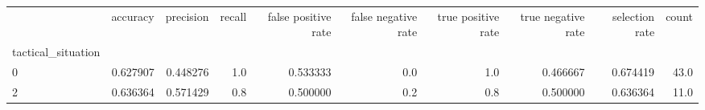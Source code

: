 \begin{tabular}{lrrrrrrrrr}
\toprule
{} &  accuracy &  precision &  recall &  false positive rate &  false negative rate &  true positive rate &  true negative rate &  selection rate &  count \\
tactical\_situation &           &            &         &                      &                      &                     &                     &                 &        \\
\midrule
0                  &  0.627907 &   0.448276 &     1.0 &             0.533333 &                  0.0 &                 1.0 &            0.466667 &        0.674419 &   43.0 \\
2                  &  0.636364 &   0.571429 &     0.8 &             0.500000 &                  0.2 &                 0.8 &            0.500000 &        0.636364 &   11.0 \\
\bottomrule
\end{tabular}
